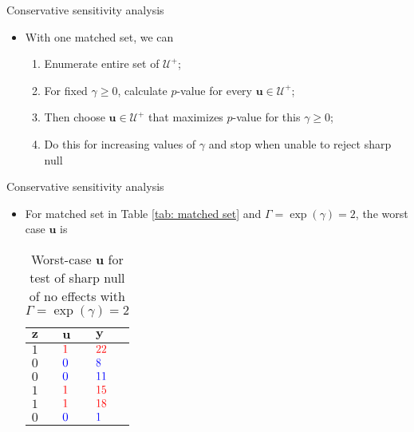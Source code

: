 \documentclass[table, xcolor={dvipsnames}, 9pt]{beamer}
\theoremstyle{newstyle}
\begin{document}
\begin{frame}{Conservative sensitivity analysis}
\vfill
\begin{itemize} \vfill
\item With one matched set, we can \vfill
\begin{enumerate} \vfill
\item Enumerate entire set of $\mathcal{U}^+$; \vfill
\item For fixed $\gamma \geq 0$, calculate $p$-value for every $\bm{u} \in \mathcal{U}^+$; \vfill
\item Then choose $\bm{u} \in \mathcal{U}^+$ that maximizes $p$-value for this $\gamma \geq 0$; \vfill
\item Do this for increasing values of $\gamma$ and stop when unable to reject sharp null \vfill
\end{enumerate} \vfill
\end{itemize} \vfill
\end{frame}
\begin{frame}{Conservative sensitivity analysis}
\vfill
\begin{itemize} \vfill
\item For matched set in Table \ref{tab: matched set} and $\Gamma = \exp(\gamma) = 2$, the worst case $\bm{u}$ is \vfill
\begin{table}[H]
\centering{}
    \begin{tabular}{l|l|l}
  $\bm{z}$ & $\bm{u}$ & $\bm{y}$ \\ \hline
  $1$ & $\textcolor{red}{1}$ & $\textcolor{red}{22}$ \\
  $0$ & $\textcolor{blue}{0}$ & $\textcolor{blue}{8}$ \\
  $0$ & $\textcolor{blue}{0}$ & $\textcolor{blue}{11}$ \\
  $1$ & $\textcolor{red}{1}$ & $\textcolor{red}{15}$ \\
  $1$ & $\textcolor{red}{1}$ & $\textcolor{red}{18}$ \\
  $0$ & $\textcolor{blue}{0}$ & $\textcolor{blue}{1}$ \\
    \end{tabular}
\caption{Worst-case $\bm{u}$ for test of sharp null of no effects with $\Gamma = \exp(\gamma) = 2$}
\end{table} \vfill
\end{itemize}
\end{frame}
\end{document}

